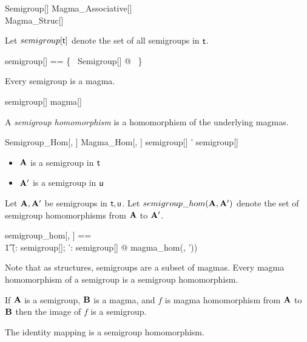 \documentclass{amsart}
\begin{document}
\begin{schema}{Semigroup}[\genT]
	Magma\_Associative[\genT] \\
	Magma\_Struc[\genT]
\end{schema}

Let $semigroup[\mathsf{t}]$ denote the set of all semigroups in $\mathsf{t}$.

\begin{zed}
	semigroup[\genT] == \{~ Semigroup[\genT] @ \strucA  ~\}
\end{zed}

\begin{remark} Every semigroup is a magma.
\begin{zed}
	semigroup[\setT] \subseteq magma[\setT]
\end{zed}
\end{remark}

A \textit{semigroup homomorphism} is a homomorphism of the underlying magmas.

\begin{schema}{Semigroup\_Hom}[\genT, \genU]
	Magma\_Hom[\genT, \genU]
\where
	\strucA \in semigroup[\genT]
\also
	\strucA' \in semigroup[\genU]
\end{schema}

\begin{itemize}
	\item $\mathbf{A}$ is a semigroup in $\mathsf{t}$
	\item $\mathbf{A}'$ is a semigroup in $\mathsf{u}$
\end{itemize}


Let $\mathbf{A}, \mathbf{A}'$ be semigroups in $\mathsf{t}, \mathsf{u}$.
Let $semigroup\_hom(\mathbf{A}, \mathbf{A}')$ denote the set of semigroup homomorphisms from $\mathbf{A}$ to $\mathbf{A}'$.

\begin{zed}
	semigroup\_hom[\genT, \genU] == \\
	\t1	(\lambda \strucA: semigroup[\genT]; \strucA': semigroup[\genU] @ magma\_hom(\strucA, \strucA'))
\end{zed}

Note that as structures, semigroups are a subset of magmas.
Every magma homomorphism of a semigroup is a semigroup homomorphism.

If $\mathbf{A}$ is a semigroup, $\mathbf{B}$ is a magma, and $f$ is magma homomorphism from 
$\mathbf{A}$ to $\mathbf{B}$ then the image of $f$ is a semigroup.

\begin{remark}
The identity mapping is a semigroup homomorphism.
\end{remark}
\end{document}
